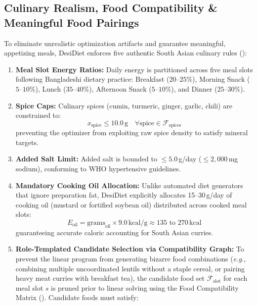 \documentclass[5p,times,twocolumn]{elsarticle}
\makeatletter
\def\systemname{DesiDiet}%
\def\my@bx{bx}
\def\my@b{b}
\DeclareRobustCommand{\systemname}{%
  \texorpdfstring{%
    \ifx\f@series\my@bx
      DesiDiet%
    \else\ifx\f@series\my@b
      DesiDiet%
    \else
      \textsc{DesiDiet}%
    \fi\fi
  }{DesiDiet}%
}
\newcommand{\eg}{\textit{e.g.}}
\makeatother
\begin{document}
\subsection{Culinary Realism, Food Compatibility \& Meaningful Food Pairings}
To eliminate unrealistic optimization artifacts and guarantee meaningful, appetizing meals, \systemname{} enforces five authentic South Asian culinary rules ():
\begin{enumerate}[leftmargin=*,itemsep=1.5pt]
  \item \textbf{Meal Slot Energy Ratios:} Daily energy is partitioned across five meal slots following Bangladeshi dietary practice: Breakfast ($20$--$25\%$), Morning Snack ($5$--$10\%$), Lunch ($35$--$40\%$), Afternoon Snack ($5$--$10\%$), and Dinner ($25$--$30\%$).
  \item \textbf{Spice Caps:} Culinary spices (cumin, turmeric, ginger, garlic, chili) are constrained to:
  \begin{equation}
  x_{\text{spice}} \le 10.0\,\text{g} \quad \forall \text{spice} \in \mathcal{F}_{\text{spices}}
  \end{equation}
  preventing the optimizer from exploiting raw spice density to satisfy mineral targets.
  \item \textbf{Added Salt Limit:} Added salt is bounded to $\le 5.0$\,g/day ($\le 2,000$\,mg sodium), conforming to WHO hypertensive guidelines.
  \item \textbf{Mandatory Cooking Oil Allocation:} Unlike automated diet generators that ignore preparation fat, \systemname{} explicitly allocates 15--30\,g/day of cooking oil (mustard or fortified soybean oil) distributed across cooked meal slots:
  \begin{equation}
  E_{\text{oil}} = \text{grams}_{\text{oil}} \times 9.0\,\text{kcal/g} \approx 135 \text{ to } 270\,\text{kcal}
  \end{equation}
  guaranteeing accurate caloric accounting for South Asian curries.
  \item \textbf{Role-Templated Candidate Selection via Compatibility Graph:}
  To prevent the linear program from generating bizarre food combinations (\eg{}, combining multiple uncoordinated lentils without a staple cereal, or pairing heavy meat curries with breakfast tea), the candidate food set $\mathcal{F}_{\text{slot}}$ for each meal slot $s$ is pruned prior to linear solving using the Food Compatibility Matrix (). Candidate foods must satisfy:
  \begin{equation}

\end{equation}
\end{enumerate}
\end{document}
